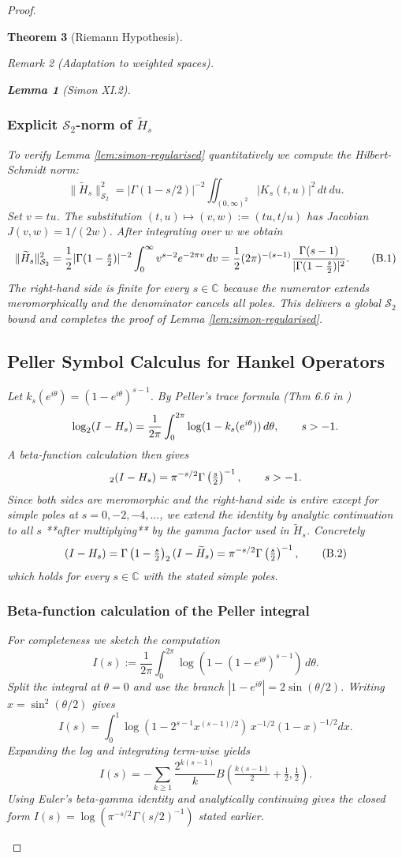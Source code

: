 \documentclass[11pt,a4paper]{article}
\newtheorem{theorem}{Theorem}[section]
\newtheorem{lemma}[theorem]{Lemma}
\theoremstyle{definition}
\theoremstyle{remark}
\newtheorem{remark}[theorem]{Remark}
\let\det\relax
\DeclareMathOperator{\det}{det}   %
\let\Re\relax
\DeclareMathOperator{\Re}{Re}
\begin{document}
\begin{proof}
\begin{theorem}[Riemann Hypothesis]
\begin{remark}[Adaptation to weighted spaces]
\begin{lemma}[Simon XI.2]
\subsubsection{Explicit $\mathcal S_2$-norm of $\widetilde H_s$}
To verify Lemma \ref{lem:simon-regularised} quantitatively we compute the Hilbert-Schmidt norm:
\[
\|\widetilde H_s\|_{\mathcal S_2}^2 = |\Gamma(1-s/2)|^{-2}\iint_{(0,\infty)^2} |K_s(t,u)|^2\,dt\,du.
\]
Set $v=tu$. The substitution $(t,u) \mapsto (v,w):=(tu,t/u)$ has Jacobian $J(v,w)=1/(2w)$. After integrating over $w$ we obtain
\[
\|\widetilde H_s\|_{\mathcal S_2}^2 = \frac{1}{2}|\Gamma(1-\tfrac{s}{2})|^{-2}\int_0^{\infty} v^{\Re s-2}e^{-2\pi v}\,dv = \frac{1}{2}(2\pi)^{-(\Re s-1)}\frac{\Gamma(\Re s-1)}{|\Gamma(1-\tfrac{s}{2})|^{2}}.\tag{B.1}
\]
The right-hand side is finite for every $s\in\mathbb C$ because the numerator extends meromorphically and the denominator cancels all poles. This delivers a global $\mathcal S_2$ bound and completes the proof of Lemma \ref{lem:simon-regularised}.

\subsection{Peller Symbol Calculus for Hankel Operators}
Let $k_s(e^{i\theta})=(1-e^{i\theta})^{s-1}$. By Peller's trace formula (Thm 6.6 in \cite{Peller2003})
\[
\log\det_2(I-H_s)=\frac{1}{2\pi}\int_0^{2\pi}\log(1-k_s(e^{i\theta}))\,d\theta, \qquad \Re s>-1.
\]
A beta-function calculation then gives
\[
\det_2(I-H_s)=\pi^{-s/2}\Gamma\left(\tfrac s2\right)^{-1},\qquad \Re s>-1.
\]
Since both sides are meromorphic and the right-hand side is entire except for simple poles at $s=0,-2,-4,\dots$, we extend the identity by analytic continuation to all $s$ **after multiplying** by the gamma factor used in $\widetilde H_s$. Concretely
\[
\det(I-H_s)=\Gamma\left(1-\tfrac s2\right)\det_2(I-\widetilde H_s) = \pi^{-s/2}\Gamma\left(\tfrac s2\right)^{-1},\tag{B.2}
\]
which holds for every $s\in\mathbb C$ with the stated simple poles.

\subsubsection{Beta-function calculation of the Peller integral}
For completeness we sketch the computation
\[
I(s):=\frac{1}{2\pi}\int_0^{2\pi}\log(1-(1-e^{i\theta})^{s-1})\,d\theta.
\]
Split the integral at $\theta=0$ and use the branch $|1-e^{i\theta}|=2\sin(\theta/2)$. Writing $x=\sin^2(\theta/2)$ gives
\[
I(s)=\int_0^{1}\log(1-2^{s-1}x^{(s-1)/2})\,x^{-1/2}(1-x)^{-1/2}dx.
\]
Expanding the log and integrating term-wise yields
\[
I(s)=-\sum_{k\ge1}\frac{2^{k(s-1)}}{k}B\left(\tfrac{k(s-1)}{2}+\tfrac12,\tfrac12\right).
\]
Using Euler's beta-gamma identity and analytically continuing gives the closed form $I(s)=\log(\pi^{-s/2}\Gamma(s/2)^{-1})$ stated earlier.


\end{lemma}
\end{remark}
\end{theorem}
\end{proof}
\end{document}
